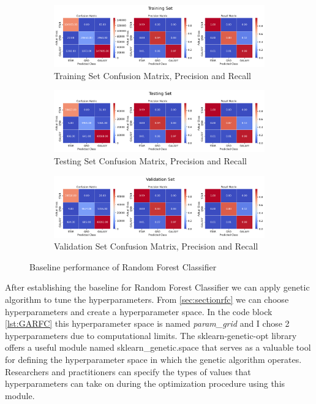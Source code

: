 \begin{figure}[H] 
    \centering
    \begin{subfigure}{\textwidth}
        \includegraphics[width=\linewidth]{images/Baseline_RFC_Train.png}
        \caption{Training Set Confusion Matrix, Precision and Recall}
        \label{fig:BaselineRFCTrain}
    \end{subfigure}
    \begin{subfigure}{\textwidth}
        \includegraphics[width=\linewidth]{images/Baseline_RFC_Test.png}
        \caption{Testing Set Confusion Matrix, Precision and Recall}
        \label{fig:BaselineRFCTest}
    \end{subfigure}
    \begin{subfigure}{\textwidth}
        \includegraphics[width=\linewidth]{images/Baseline_RFC_Val.png}
        \caption{Validation Set Confusion Matrix, Precision and Recall}
        \label{fig:BaselineRFCVal}
    \end{subfigure}
    \caption{Baseline performance of Random Forest Classifier}
    \label{fig:BaselineRFC}
\end{figure}

After establishing the baseline for Random Forest Classifier we can apply genetic algorithm to tune the hyperparameters. From \autoref{sec:sectionrfc} we can choose hyperparameters and create a hyperparameter space. In the code block \autoref{lst:GARFC} this hyperparameter space is named \textit{param\_grid} and I chose 2 hyperparameters due to computational limits. The sklearn-genetic-opt library offers a useful module named sklearn\_genetic.space that serves as a valuable tool for defining the hyperparameter space in which the genetic algorithm operates. Researchers and practitioners can specify the types of values that hyperparameters can take on during the optimization procedure using this module. 

